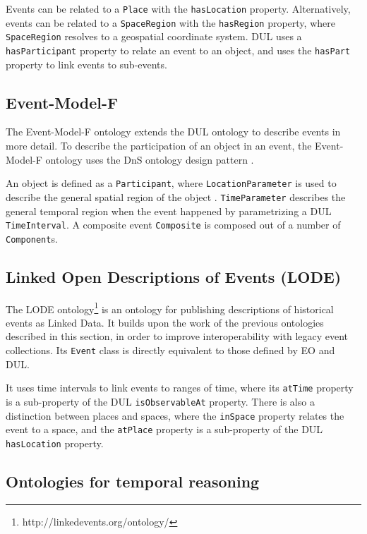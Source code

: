 Events can be related to a \texttt{Place} with the \texttt{hasLocation} property. Alternatively, events can be related to a \texttt{SpaceRegion} with the \texttt{hasRegion} property, where \texttt{Space\-Region} resolves to a geospatial coordinate system. \ac{DUL} uses a \texttt{hasParticipant} property to relate an event to an object, and uses the \texttt{hasPart} property to link events to sub-events.

\subsection{Event-Model-F}

The Event-Model-F ontology extends the \ac{DUL} ontology to describe events in more detail. To describe the participation of an object in an event, the Event-Model-F ontology uses the \ac{DnS} ontology design pattern \cite{Shaw2009}. 

An object is defined as a \texttt{Participant}, where \texttt{LocationParameter} is used to describe the general spatial region of the object \cite{Scherp2011}. \texttt{Time\-Parameter} describes the general temporal region when the event happened by parametrizing a \ac{DUL} \texttt{TimeInterval}. A composite event \texttt{Composite} is composed out of a number of \texttt{Com\-po\-nent}s.

\subsection{Linked Open Descriptions of Events (LODE)}

The \ac{LODE} ontology\footnote{http://linkedevents.org/ontology/} is an ontology for publishing descriptions of historical events as Linked Data. It builds upon the work of the previous ontologies described in this section, in order to improve interoperability with legacy event collections. Its \texttt{Event} class is directly equivalent to those defined by \ac{EO} and \ac{DUL}. 

It uses time intervals to link events to ranges of time, where its \texttt{atTime} property is a sub-property of the \ac{DUL} \texttt{isObservableAt} property. There is also a distinction between places and spaces, where the \texttt{inSpace} property relates the event to a space, and the \texttt{atPlace} property is a sub-property of the \ac{DUL} \texttt{hasLocation} property.


\subsection{Ontologies for temporal reasoning}
\label{TemporalReasoning}

